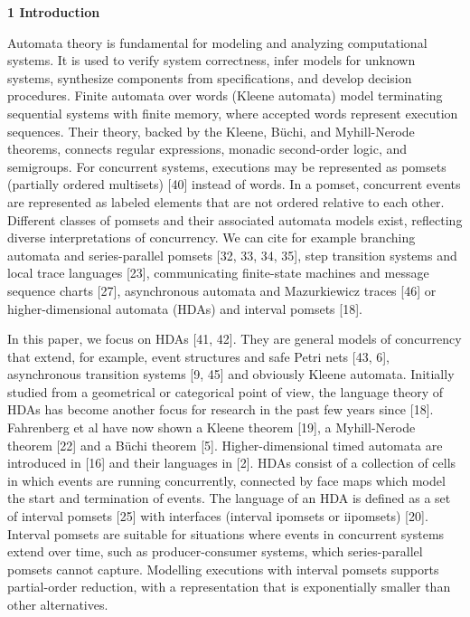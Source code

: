 
 
\par\medskip\noindent\textbf{1 Introduction}\par
 
 
Automata theory is fundamental for modeling and analyzing computational systems. It is used to verify system correctness, infer models for unknown systems, synthesize components from specifications, and develop decision procedures. Finite automata over words (Kleene automata) model terminating sequential systems with finite memory, where accepted words represent execution sequences. Their theory, backed by the Kleene, Büchi, and Myhill-Nerode theorems, connects regular expressions, monadic second-order logic, and semigroups. For concurrent systems, executions may be represented as pomsets (partially ordered multisets) [40] instead of words. In a pomset, concurrent events are represented as labeled elements that are not ordered relative to each other. Different classes of pomsets and their associated automata models exist, reflecting diverse interpretations of concurrency. We can cite for example branching automata and series-parallel pomsets [32, 33, 34, 35], step transition systems and local trace languages [23], communicating finite-state machines and message sequence charts [27], asynchronous automata and Mazurkiewicz traces [46] or higher-dimensional automata (HDAs) and interval pomsets [18].\par
 
 
 
In this paper, we focus on HDAs [41, 42]. They are general models of concurrency that extend, for example, event structures and safe Petri nets [43, 6], asynchronous transition systems [9, 45] and obviously Kleene automata. Initially studied from a geometrical or categorical point of view, the language theory of HDAs has become another focus for research in the past few years since [18]. Fahrenberg et al have now shown a Kleene theorem [19], a Myhill-Nerode theorem [22] and a Büchi theorem [5]. Higher-dimensional timed automata are introduced in [16] and their languages in [2]. HDAs consist of a collection of cells in which events are running concurrently, connected by face maps which model the start and termination of events. The language of an HDA is defined as a set of interval pomsets [25] with interfaces (interval ipomsets or iipomsets) [20]. Interval pomsets are suitable for situations where events in concurrent systems extend over time, such as producer-consumer systems, which series-parallel pomsets cannot capture. Modelling executions with interval pomsets supports partial-order reduction, with a representation that is exponentially smaller than other alternatives.\par
 
